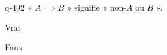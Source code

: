 \begin{truefalse}{q-492}
« $A \implies B$ » signifie « non-$A$ ou $B$ ».
\item* Vrai
\item Faux
\end{truefalse}

